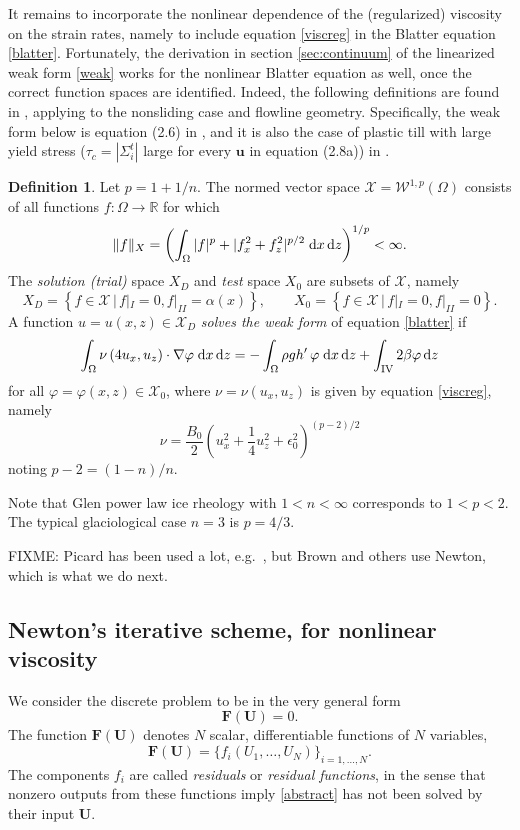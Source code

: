 \documentclass[11pt,final,reqno]{amsart}
\theoremstyle{remark}
\theoremstyle{definition}
\newtheorem*{defn}{Definition}
\newcommand{\eps}{\epsilon}
\newcommand{\RR}{\mathbb{R}}
\newcommand{\bbF}{\mathbf{F}}
\newcommand{\bU}{\mathbf{U}}
\newcommand{\WonepX}[1]{\mathcal{W}^{1,p}_{#1}(\Omega)}
\newcommand{\Wonep}{\WonepX{}}
\newcommand{\X}{\mathcal{X}}
\newcommand{\XD}{\mathcal{X}_D}
\newcommand{\Xzero}{\mathcal{X}_0}
\begin{document}
It remains to incorporate the nonlinear dependence of the (regularized) viscosity on the strain rates, namely to include equation \eqref{viscreg} in the Blatter equation \eqref{blatter}.  Fortunately, the derivation in section  \ref{sec:continuum} of the linearized weak form \eqref{weak} works for the nonlinear Blatter equation as well, once the correct function spaces are identified.  Indeed, the following definitions are found in \cite{RappazReist05,SchoofCoulombBlatter}, applying to the nonsliding case and flowline geometry.  Specifically, the weak form below is equation (2.6) in \cite{RappazReist05}, and it is also the case of plastic till with large yield stress ($\tau_c=|\Sigma_i^t|$ large for every $\mathbf{u}$ in equation (2.8a)) in \cite{SchoofCoulombBlatter}.

\begin{defn}  Let $p=1+1/n$.  The normed vector space $\X=\Wonep$ consists of all functions $f : \Omega \to \RR$ for which \cite{Evans}
	$$\|f\|_X = \left(\int_\Omega |f|^p + |f_x^2 + f_z^2|^{p/2} \;\mathrm{d}x\,\mathrm{d}z\right)^{1/p} < \infty.$$
The \emph{solution (trial)} space $X_D$ and \emph{test} space $X_0$ are subsets of $\X$, namely
     $$X_D = \left\{f \in \X \,\Big|\, f|_{I} = 0, f|_{II} = \alpha(x)\right\}, \qquad X_0 = \left\{f \in \X \,\Big|\, f|_{I} = 0, f|_{II} = 0\right\}.$$
A function $u=u(x,z)\in \XD$ \emph{solves the weak form} of equation \eqref{blatter} if
\begin{equation}
\int_\Omega \nu\, (4 u_x, u_z) \cdot \nabla \varphi \;\mathrm{d}x\,\mathrm{d}z = - \int_\Omega \rho g h'\,\varphi \;\mathrm{d}x\,\mathrm{d}z + \int_{\mathrm{IV}} 2 \beta \varphi \,\mathrm{d}z \label{weakfull}
\end{equation}
for all $\varphi=\varphi(x,z)\in \Xzero$, where $\nu = \nu(u_x,u_z)$ is given by equation \eqref{viscreg}, namely
     $$\nu = \frac{B_0}{2} \left(u_x^2 + \frac{1}{4}u_z^2 + \eps_0^2\right)^{(p-2)/2}$$
noting $p-2 = (1-n)/n$.
\end{defn}

Note that Glen power law ice rheology with $1<n<\infty$ corresponds to $1<p<2$.  The typical glaciological case $n=3$ is $p=4/3$.

FIXME:  Picard has been used a lot, e.g.~\cite{Pattyn03}, but Brown and others \cite{BrownSmithAhmadia} use Newton, which is what we do next.

\subsection*{Newton's iterative scheme, for nonlinear viscosity}  We consider the discrete problem to be in the very general form
\begin{equation}
   \bbF(\bU) = 0.  \label{abstract}
\end{equation}
The function $\bbF(\bU)$ denotes $N$ scalar, differentiable functions of $N$ variables,
	$$\bbF(\bU)=\{f_i(U_1,\dots,U_N)\}_{i=1,\dots,N}.$$
The components $f_i$ are called \emph{residuals} or \emph{residual functions}, in the sense that nonzero outputs from these functions imply \eqref{abstract} has not been solved by their input $\bU$.
\end{document}
